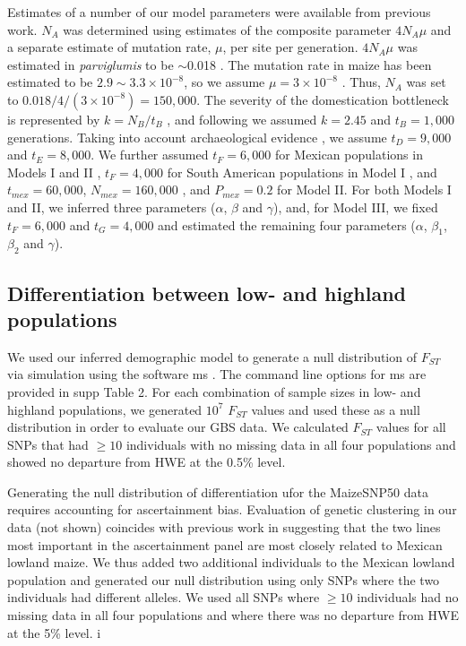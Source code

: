 Estimates of a number of our model parameters were available from previous work.    
$N_A$ was determined using estimates of the composite parameter $4N_A\mu$ and a separate estimate of mutation rate, $\mu$, per site per generation.  $4N_A\mu$ was estimated in \emph{parviglumis} to be $\sim$0.018  \cite[]{Eyre-Walker_1998_9539756,Tenaillon_2001_11470895,Tenaillon_2004_15014173,Wright_2005_15919994,Ross-Ibarra_2009_19153259}.  
The mutation rate in maize has been estimated to be $2.9\sim 3.3\times 10^{-8}$, so we assume $\mu=3\times 10^{-8}$ \cite[]{Clark_2005_16079248}.  
Thus, $N_A$ was set to $0.018/4/(3\times 10^{-8}) = 150,000$.
The severity of the domestication bottleneck is represented by $k=N_B/t_B$ \cite[]{Eyre-Walker_1998_9539756,Wright_2005_15919994}, and following \cite{Wright_2005_15919994} we assumed $k=2.45$ and $t_B=1,000$ generations.  
Taking into account archaeological evidence \cite[]{Piperno_2009_19307570}, we assume $t_D=9,000$ and $t_E=8,000$.  
We further assumed $t_F=6,000$ for Mexican populations in Models I and II \cite[]{Piperno_2006_69}, $t_F=4,000$ for South American populations in Model I \cite[]{Perry_2006_16511492}, and $t_{mex}=60,000$, $N_{mex}=160,000$ \cite[]{Ross-Ibarra_2009_19153259}, and $P_{mex}=0.2$ \cite[]{vanHeerwaarden_2011_21189301} for Model II. 
For both Models I and II, we inferred three parameters ($\alpha$, $\beta$ and $\gamma$), and, for Model III, we fixed $t_F=6,000$ and $t_G=4,000$ \cite[]{Piperno_2006_69,Perry_2006_16511492} and estimated the remaining four parameters ($\alpha$, $\beta_1$, $\beta_2$ and $\gamma$).

\subsection*{Differentiation between low- and highland populations}
We used our inferred demographic model to generate a null distribution of $F_{ST}$ via simulation using the software {\sf ms} \cite[]{Hudson_2002_11847089}.   
The command line options for {\sf ms} are provided in supp Table 2.  
For each combination of sample sizes in low- and highland populations, we generated $10^7$ $F_{ST}$ values and used these as a null distribution in order to evaluate our GBS data.   We calculated $F_{ST}$ values for all SNPs that had $\geq10$ individuals with no missing data in all four populations and showed no departure from HWE at the 0.5\% level. 

Generating the null distribution of differentiation ufor the MaizeSNP50 data requires accounting for ascertainment bias. Evaluation of genetic clustering in our data (not shown) coincides with previous work \cite[]{Hufford_2012_22660546} in suggesting that the two lines most important in the ascertainment panel are most closely related to Mexican lowland maize.  
We thus added two additional individuals to the Mexican lowland population and generated our null distribution using only SNPs where the two individuals had different alleles. 
We used all SNPs where $\geq10$ individuals had no missing data in all four populations and where there was no departure from HWE at the 5\% level. i

